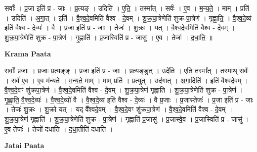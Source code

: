 \documentclass[17pt]{extarticle}
\begin{document}
सर्वाः᳚ । प्र॒जा इति॑ प्र - जाः । प्र॒त्यङ् । उदिति॑ । ए॒ति॒ । तस्मा᳚त् । सर्वः॑ । ए॒व । म॒न्य॒ते॒ । माम् । प्रति॑ । उदिति॑ । अ॒गा॒त् । इति॑ । वै॒श्व॒दे॒वमिति॑ वैश्व - दे॒वम् । शु॒क्र॒पा॒त्रेणेति॑ शुक्र-पा॒त्रेण॑ । गृ॒ह्णा॒ति॒ । वै॒श्व॒दे॒व्य॑ इति॑ वैश्व - दे॒व्यः॑ । वै । प्र॒जा इति॑ प्र - जाः । तेजः॑ । शु॒क्रः । यत् । वै॒श्व॒दे॒वमिति॑ वैश्व - दे॒वम् । शु॒क्र॒पा॒त्रेणेति॑ शुक्र - पा॒त्रेण॑ । गृ॒ह्णाति॑ । प्र॒जास्विति॑ प्र - जासु॑ । ए॒व । तेजः॑ । द॒धा॒ति॒ ॥  \newline


\textbf{Krama Paata} \newline

सर्वाः᳚ प्र॒जाः । प्र॒जाः प्र॒त्यङ्‍ङ् । प्र॒जा इति॑ प्र - जाः । प्र॒त्यङ्‍ङुत् । उदे॑ति । ए॒ति॒ तस्मा᳚त् । तस्मा॒थ् सर्वः॑ । सर्व॑ ए॒व । ए॒व म॑न्यते । म॒न्य॒ते॒ माम् । माम् प्रति॑ । प्रत्युत् । उद॑गात् । अ॒गा॒दिति॑ । इति॑ वैश्वदे॒वम् । वै॒श्व॒दे॒वꣳ शु॑क्रपा॒त्रेण॑ । वै॒श्व॒दे॒वमिति॑ वैश्व - दे॒वम् । शु॒क्र॒पा॒त्रेण॑ गृह्णाति । शु॒क्र॒पा॒त्रेणेति॑ शुक्र - पा॒त्रेण॑ । गृ॒ह्णा॒ति॒ वै॒श्व॒दे॒व्यः॑ । वै॒श्व॒दे॒व्यो॑ वै । वै॒श्व॒दे॒व्य॑ इति॑ वैश्व - दे॒व्यः॑ । वै प्र॒जाः । प्र॒जास्तेजः॑ । प्र॒जा इति॑ प्र - जाः । तेजः॑ शु॒क्रः । शु॒क्रो यत् । यद् वै᳚श्वदे॒वम् । वै॒श्व॒दे॒वꣳ शु॑क्रपा॒त्रेण॑ । वै॒श्व॒दे॒वमिति॑ वैश्व - दे॒वम् । शु॒क्र॒पा॒त्रेण॑ गृ॒ह्णाति॑ । शु॒क्र॒पा॒त्रेणेति॑ शुक्र - पा॒त्रेण॑ । गृ॒ह्णाति॑ प्र॒जासु॑ । प्र॒जास्वे॒व । प्र॒जास्विति॑ प्र - जासु॑ । ए॒व तेजः॑ । तेजो॑ दधाति । द॒धा॒तीति॑ दधाति । \newline

\textbf{Jatai Paata} \newline
\end{document}
